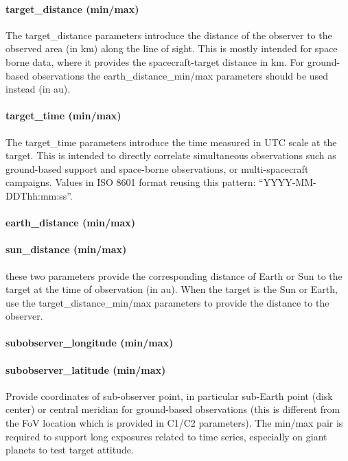 \documentclass[11pt,a4paper]{ivoa}
\begin{document}
\paragraph{target\_distance (min/max)}

The target\_distance parameters introduce the distance of the observer to the observed area (in km) along the line of sight. This is mostly intended for space borne data, where it provides the spacecraft-target distance in km. For ground-based observations the earth\_distance\_min/max parameters should be used instead (in au).

\paragraph{target\_time (min/max)}

The target\_time parameters introduce the time measured in UTC scale at the target. This is intended to directly correlate simultaneous observations such as ground-based support and space-borne observations, or multi-spacecraft campaigns. Values in ISO 8601 format reusing this pattern: “YYYY-MM-DDThh:mm:ss”. 

\paragraph{earth\_distance (min/max)}

\paragraph{sun\_distance (min/max)}

these two parameters provide the corresponding distance of Earth or Sun to the target at the time of observation (in au). When the target is the Sun or Earth, use the target\_distance\_min/max parameters to provide the distance to the observer.

\paragraph{subobserver\_longitude (min/max)}

\paragraph{subobserver\_latitude (min/max)}

Provide coordinates of sub-observer point, in particular sub-Earth point (disk center) or central meridian for ground-based observations (this is different from the FoV location which is provided in C1/C2 parameters). The min/max pair is required to support long exposures related to time series, especially on giant planets to test target attitude.
\end{document}
